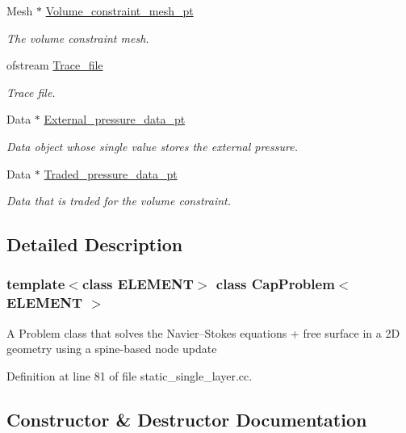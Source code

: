 \begin{DoxyCompactItemize}
Mesh $\ast$ \hyperlink{classCapProblem_a0a115f38ca8ff18937619dd918a38bb1}{Volume\+\_\+constraint\+\_\+mesh\+\_\+pt}
\begin{DoxyCompactList}\small\item\em The volume constraint mesh. \end{DoxyCompactList}\item 
ofstream \hyperlink{classCapProblem_a46ba6cbe3e82a36db8831fdd53d9f3a9}{Trace\+\_\+file}
\begin{DoxyCompactList}\small\item\em Trace file. \end{DoxyCompactList}\item 
Data $\ast$ \hyperlink{classCapProblem_a3990e9e6a2e4545a470e84ff1fead5eb}{External\+\_\+pressure\+\_\+data\+\_\+pt}
\begin{DoxyCompactList}\small\item\em Data object whose single value stores the external pressure. \end{DoxyCompactList}\item 
Data $\ast$ \hyperlink{classCapProblem_a1ad1a124cb5aa9c1724cbef89e47a35b}{Traded\+\_\+pressure\+\_\+data\+\_\+pt}
\begin{DoxyCompactList}\small\item\em Data that is traded for the volume constraint. \end{DoxyCompactList}\end{DoxyCompactItemize}


\subsection{Detailed Description}
\subsubsection*{template$<$class E\+L\+E\+M\+E\+NT$>$\newline
class Cap\+Problem$<$ E\+L\+E\+M\+E\+N\+T $>$}

A Problem class that solves the Navier--Stokes equations + free surface in a 2D geometry using a spine-\/based node update 

Definition at line 81 of file static\+\_\+single\+\_\+layer.\+cc.



\subsection{Constructor \& Destructor Documentation}
\mbox{\label{classCapProblem_ab03ed8e2c1b44911d11209e00cb28a42}} 
